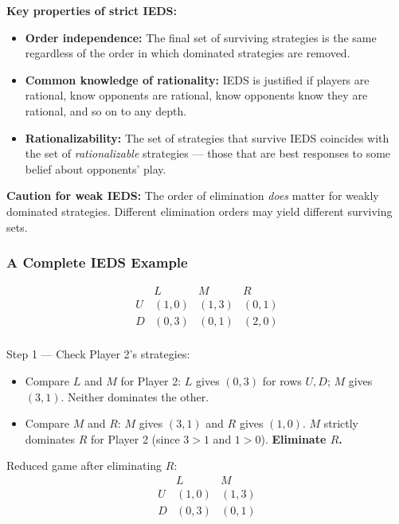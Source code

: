 \documentclass[hidelinks]{article}
\begin{document}
\textbf{Key properties of strict IEDS:}
\begin{itemize}
    \item \textbf{Order independence:} The final set of surviving strategies is the same regardless of the order in which dominated strategies are removed.
    \item \textbf{Common knowledge of rationality:} IEDS is justified if players are rational, know opponents are rational, know opponents know they are rational, and so on to any depth.
    \item \textbf{Rationalizability:} The set of strategies that survive IEDS coincides with the set of \textit{rationalizable} strategies — those that are best responses to some belief about opponents' play.
\end{itemize}

\textbf{Caution for weak IEDS:} The order of elimination \textit{does} matter for weakly dominated strategies. Different elimination orders may yield different surviving sets.

\subsubsection{A Complete IEDS Example}

\[
\begin{array}{c|ccc}
 & L & M & R \\
\hline
U & (1,0) & (1,3) & (0,1) \\
D & (0,3) & (0,1) & (2,0) \\
\end{array}
\]

Step 1 — Check Player 2's strategies:
\begin{itemize}
    \item Compare $L$ and $M$ for Player 2: $L$ gives $(0,3)$ for rows $U,D$; $M$ gives $(3,1)$. Neither dominates the other.
    \item Compare $M$ and $R$: $M$ gives $(3,1)$ and $R$ gives $(1,0)$. $M$ strictly dominates $R$ for Player 2 (since $3>1$ and $1>0$). \textbf{Eliminate $R$.}
\end{itemize}

Reduced game after eliminating $R$:
\[
\begin{array}{c|cc}
 & L & M \\
\hline
U & (1,0) & (1,3) \\
D & (0,3) & (0,1) \\
\end{array}
\]
\end{document}
